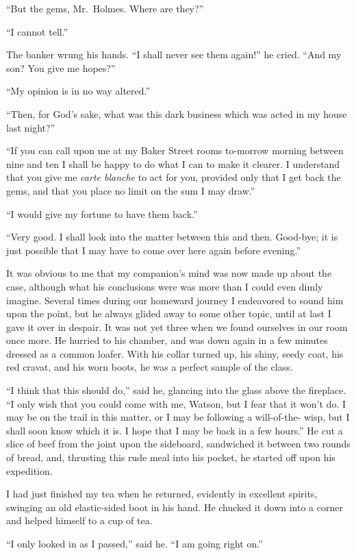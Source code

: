 “But the gems, Mr.~Holmes. Where are they?”

“I cannot tell.”

The banker wrung his hands. “I shall never see them
again!” he cried. “And my son? You give me hopes?”

“My opinion is in no way altered.”

“Then, for God’s sake, what was this dark business which
was acted in my house last night?”

“If you can call upon me at my Baker Street rooms
to-morrow morning between nine and ten I shall be happy to do
what I can to make it clearer. I understand that you give
me \textit{carte blanche} to act for you, provided only that I get back
the gems, and that you place no limit on the sum I may draw.”

“I would give my fortune to have them back.”

“Very good. I shall look into the matter between this and
then. Good-bye; it is just possible that I may have to come
over here again before evening.”

It was obvious to me that my companion’s mind was now
made up about the case, although what his conclusions were
was more than I could even dimly imagine. Several times
during our homeward journey I endeavored to sound him
upon the point, but he always glided away to some other topic,
until at last I gave it over in despair. It was not yet three
when we found ourselves in our room once more. He hurried
to his chamber, and was down again in a few minutes dressed
as a common loafer. With his collar turned up, his shiny,
seedy coat, his red cravat, and his worn boots, he was a perfect
sample of the class.

“I think that this should do,” said he, glancing into the
glass above the fireplace. “I only wish that you could come
with me, Watson, but I fear that it won’t do. I may be on
the trail in this matter, or I may be following a will-of-the-%
wisp, but I shall soon know which it is. I hope that I may be
back in a few hours.” He cut a slice of beef from the joint
upon the sideboard, sandwiched it between two rounds of
bread, and, thrusting this rude meal into his pocket, he started
off upon his expedition.

I had just finished my tea when he returned, evidently in
excellent spirits, swinging an old elastic-sided boot in his
hand. He chucked it down into a corner and helped himself
to a cup of tea.

“I only looked in as I passed,” said he. “I am going
right on.”


